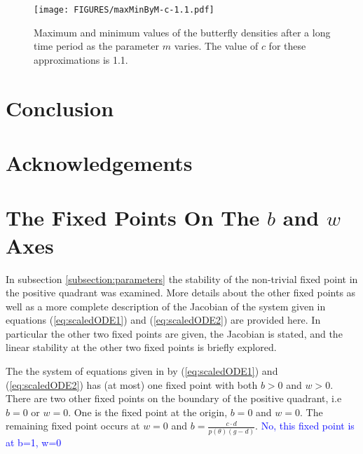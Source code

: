\documentclass[review,authoryear]{elsarticle}
\begin{document}
\begin{figure}[htb]
  \centering
  \texttt{[image: FIGURES/maxMinByM-c-1.1.pdf]}
  \caption[Maximum and minimum values of the butterfly
  density with $c=1.1$]{Maximum and minimum values of the butterfly densities after
    a long time period as the parameter $m$ varies. The value of $c$ for these approximations is 1.1.}
  \label{fig:maxMinButterflySmallMu-c-1.1}
\end{figure}


\section{Conclusion}

\section{Acknowledgements}

\clearpage

\appendix

\section{The Fixed Points On The $b$ and $w$ Axes}
\label{appendix:otherFixedPoints}

In subsection \ref{subsection:parameters} the stability of the
non-trivial fixed point in the positive quadrant was examined. More details about the other
fixed points as well as a more complete description of the Jacobian of
the system given in equations (\ref{eq:scaledODE1}) and
(\ref{eq:scaledODE2}) are provided here. In particular the other two
fixed points are given,  the Jacobian is stated, and the linear
stability at the other two fixed points is briefly explored.

The the system of equations given in by
(\ref{eq:scaledODE1}) and (\ref{eq:scaledODE2}) has (at most) one fixed point
with both $b>0$ and $w>0$. There are two other fixed points on the boundary of the positive quadrant, i.e $b=0$ or $w=0$.  One is the fixed point at the origin, $b=0$ and $w=0$.
The remaining fixed point occurs at $w=0$ and $b=\frac{c\cdot
  d}{p(\theta)\left(g - d\right)}$. \textcolor{blue} {No, this fixed point is at b=1, w=0}
  
\end{document}
